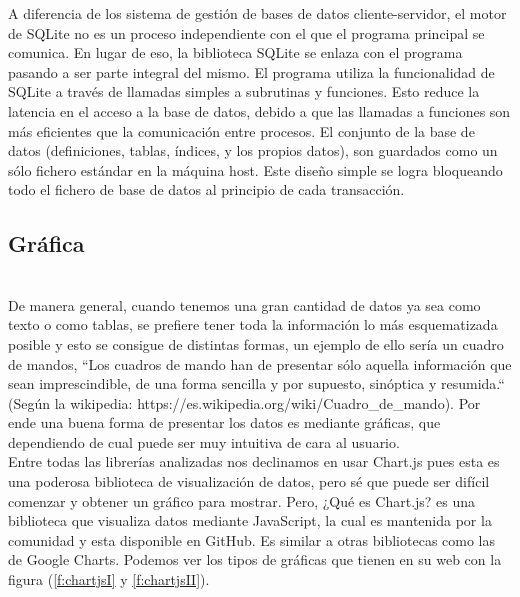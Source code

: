 \documentclass[a4paper, 11pt]{article}
\begin{document}
\begin{itemize}
            A diferencia de los sistema de gestión de bases de datos cliente-servidor,
            el motor de SQLite no es un proceso independiente con el que el programa
            principal se comunica. En lugar de eso, la biblioteca SQLite se enlaza con
            el programa pasando a ser parte integral del mismo. El programa utiliza la
            funcionalidad de SQLite a través de llamadas simples a subrutinas y
            funciones. Esto reduce la latencia en el acceso a la base de datos, debido
            a que las llamadas a funciones son más eficientes que la comunicación entre
            procesos. El conjunto de la base de datos (definiciones, tablas, índices,
            y los propios datos), son guardados como un sólo fichero estándar en la
            máquina host. Este diseño simple se logra bloqueando todo el fichero de
            base de datos al principio de cada transacción.

        \subsection{Gráfica}\\

          De manera general, cuando tenemos una gran cantidad de datos ya sea
          como texto o como tablas, se prefiere tener toda la información lo
          más esquematizada posible y esto se consigue de distintas formas, un
          ejemplo de ello sería un cuadro de mandos, ``Los cuadros de mando han
          de presentar sólo aquella información que sean imprescindible, de una
          forma sencilla y por supuesto, sinóptica y resumida.`` (Según la
          wikipedia: https://es.wikipedia.org/wiki/Cuadro\_de\_mando). Por ende
          una buena forma de presentar los datos es mediante gráficas, que
          dependiendo de cual puede ser muy intuitiva de cara al usuario.\\

          Entre todas las librerías analizadas nos declinamos en usar Chart.js
          pues esta es una poderosa biblioteca de visualización de datos, pero
          sé que puede ser difícil comenzar y obtener un gráfico para mostrar.
          Pero, ¿Qué es Chart.js? es una biblioteca que visualiza datos mediante
          JavaScript, la cual es mantenida por la comunidad y esta disponible
          en GitHub. Es similar a otras bibliotecas como las de Google Charts.
          Podemos ver los tipos de gráficas que tienen en su web con la figura
          (\ref{f:chartjsI} y \ref{f:chartjsII}).\\


\end{itemize}
\end{document}
